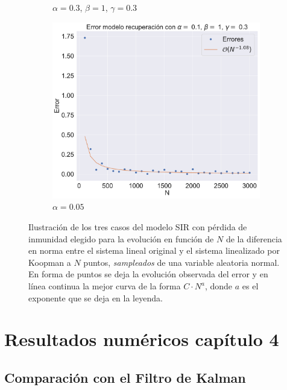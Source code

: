 \begin{figure}[h]
\begin{subfigure}[b]{0.32\textwidth}
        \caption{$\alpha=0.3$, $\beta=1$, $\gamma=0.3$}
    \end{subfigure}
    \hfill
    \begin{subfigure}[b]{0.32\textwidth}
        \centering
        \includegraphics[width=\textwidth]{img/content/chapter3/SIR_rec3Errors.pdf}
        \caption{$\alpha=0.05$}
    \end{subfigure}
    \caption{Ilustración de los tres casos del modelo SIR con pérdida de inmunidad elegido para la evolución en función de $N$ de la diferencia en norma entre el sistema lineal original y el sistema linealizado por Koopman a $N$ puntos,  \textit{sampleados} de una variable aleatoria normal. En forma de puntos se deja la evolución observada del error y en línea continua la mejor curva de la forma $C \cdot N^{a}$, donde $a$ es el exponente que se deja en la leyenda.}
    \label{fig:ErrorSIR_rec}
\end{figure}


\chapter{Resultados numéricos capítulo 4}

\section{Comparación con el Filtro de Kalman}

